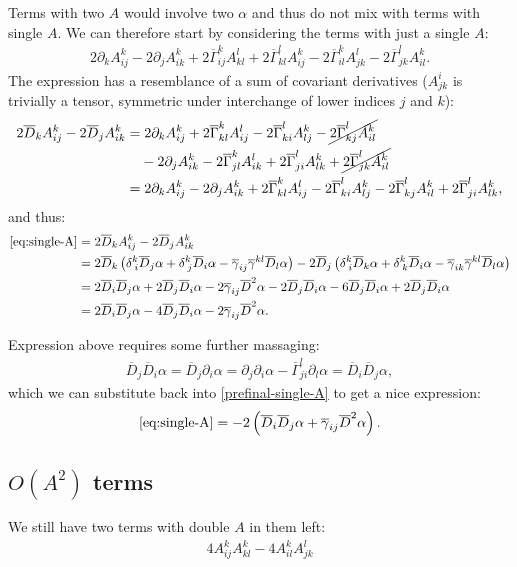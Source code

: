 \documentclass[aps,prd,preprint]{revtex4-1}
\newcommand{\ogamma}{\overline{\gamma}}
\newcommand{\OGamma}{\overline{\Gamma}}
\newcommand{\OD}{\overline{D}}
\begin{document}
Terms with two $A$ would involve two $\alpha$ and thus do not mix with terms with single $A$. We can therefore 
start by considering the terms with just a single $A$:
\begin{align}\label{eq:single-A}
2 \partial_k A^k_{ij} -2 \partial_j A^k_{ik} +
  2 \OGamma^k_{ij} A^l_{kl}  + 2 \OGamma^l_{kl} A^k_{ij} -
  2 \OGamma^k_{il} A^l_{jk} - 2 \OGamma^l_{jk} A^k_{il}.
\end{align}
The expression has a resemblance of a sum of covariant derivatives ($A^i_{jk}$ is trivially a tensor, symmetric under
interchange of lower indices $j$ and $k$):
\begin{align}\label{eq:cov-diff}
2 \OD_k A^k_{ij} - 2 \OD_j A^k_{ik} = & \;
  2 \partial_k A^k_{ij} + 2 \OGamma^k_{kl} A^l_{ij} - 2 \OGamma^l_{ki} A^k_{lj} -
    \cancel{2 \OGamma^l_{kj} A^k_{il}} \notag \\
  & - 2 \partial_j A^k_{ik} - 2 \OGamma^k_{jl} A^l_{ik} + 2 \OGamma^l_{ji} A^k_{lk} + \cancel{2 \OGamma^l_{jk} A^k_{il}} \\
= & \; 2 \partial_k A^k_{ij} - 2 \partial_j A^k_{ik} + 2 \OGamma^k_{kl} A^l_{ij} - 2 \OGamma^l_{ki} A^k_{lj} -
  2 \OGamma^l_{kj} A^k_{il} + 2 \OGamma^l_{ji} A^k_{lk},
\end{align}
and thus:
\begin{align}
\eqref{eq:single-A} = & \; 2 \OD_k A^k_{ij} - 2 \OD_j A^k_{ik} \\
= & \; 2 \OD_k \left(
    \delta^k_{\; i} \OD_j \alpha + \delta^k_{\; j} \OD_i \alpha - \ogamma_{ij} \ogamma^{kl} \OD_l \alpha
  \right) -
  2 \OD_j \left(
    \delta^k_{\; i} \OD_k \alpha + \delta^k_{\; k} \OD_i \alpha - \ogamma_{ik} \ogamma^{kl} \OD_l \alpha
  \right) \\
= & \; 2 \OD_i \OD_j \alpha + 2 \OD_j \OD_i \alpha - 2 \ogamma_{ij} \OD^2 \alpha - 2 \OD_j \OD_i \alpha -
  6 \OD_j \OD_i \alpha + 2 \OD_j \OD_i \alpha \\
= & \; 2 \OD_i \OD_j \alpha - 4 \OD_j \OD_i \alpha - 2 \ogamma_{ij} \OD^2 \alpha \label{prefinal-single-A}.
\end{align}

Expression above requires some further massaging:
\begin{align}
\OD_j \OD_i \alpha = \OD_j \partial_i \alpha = \partial_j \partial_i \alpha - \OGamma^l_{ji} \partial_l \alpha =
\OD_i \OD_j \alpha,
\end{align}
which we can substitute back into \eqref{prefinal-single-A} to get a nice expression:
\begin{align}\label{eq:final-single-A}
\eqref{eq:single-A} = -2 \left( \OD_i \OD_j \alpha + \ogamma_{ij} \OD^2 \alpha \right).
\end{align}

\subsection{\texorpdfstring{$O(A^2)$}{Double-A}  terms}

We still have two terms with double $A$ in them left:
\begin{align}
4 A^k_{ij} A^k_{kl} - 4 A^k_{il} A^l_{jk}
\end{align}
\end{document}

